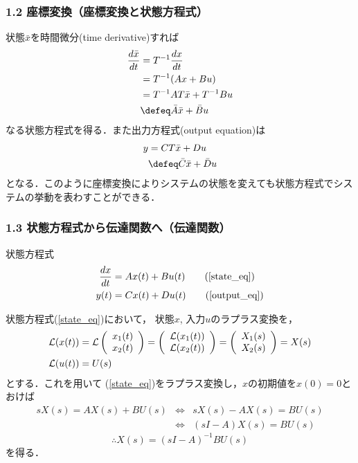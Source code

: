 \begin{frame}[t]
\frametitle{1.2 座標変換（座標変換と状態方程式）}
状態$\bar{x}$を時間微分(time derivative)すれば
\begin{align}
 \frac{d \bar{x}}{dt} &= T^{-1} \frac{dx}{dt} \nonumber \\
 &= T^{-1} ( A x + B u) \nonumber \\
 &= T^{-1} A T \bar{x} + T^{-1} B u \nonumber \\
 & \defeq \bar{A} \bar{x} + \bar{B} u
\label{eq:anotherstate_st}
\end{align}
なる状態方程式を得る．また出力方程式(output equation)は
\begin{align}
 y &= C T \bar{x} + D u \nonumber \\
   & \defeq \bar{C} \bar{x} + \bar{D} u
\label{eq:anotherstate_out}
\end{align}
となる．このように座標変換によりシステムの状態を変えても状態方程式でシス
テムの挙動を表わすことができる．
\end{frame}

\begin{frame}[t]
\frametitle{1.3 状態方程式から伝達関数へ（伝達関数）}
状態方程式
\begin{align}
 \frac{dx}{dt} &= A x(t) + B u(t) \tag{\ref{state_eq}} \\
 y(t) &= C x(t) + D u(t) \tag{\ref{output_eq}}
\end{align}

状態方程式(\ref{state_eq})において，
状態$x$, 入力$u$のラプラス変換を，
\begin{align}
 {\cal L}(x(t)) &=
 {\cal L} \left(
        \begin{array}{c}
	 x_1(t) \\
	 x_2(t)
	\end{array}
	\right) =
 \left(
 \begin{array}{c}
  {\cal L}(x_1(t)) \\
  {\cal L}(x_2(t))
 \end{array}
 \right) =
 \left(
 \begin{array}{c}
  X_1(s) \\
  X_2(s)
 \end{array}
 \right) = X(s) \\
 {\cal L}(u(t)) &= U(s)
\end{align}
とする．これを用いて
(\ref{state_eq})をラプラス変換し，$x$の初期値を$x(0) = 0$とおけば
\begin{eqnarray*}
 s X(s) = A X(s) + B U(s) & \Leftrightarrow & s X(s) - A X(s) = B U(s) \\
                          & \Leftrightarrow & (sI - A)X(s) = B U(s)
\end{eqnarray*}
\begin{equation}
 \therefore X(s) = (s I - A)^{-1} B U(s)
\end{equation}
を得る．
\end{frame}

